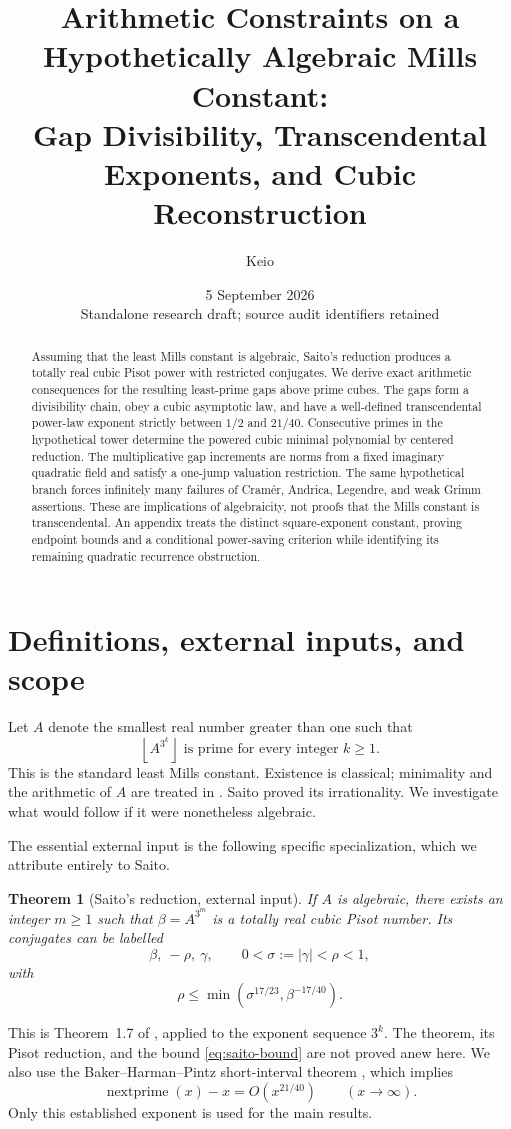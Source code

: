 \documentclass[11pt,a4paper]{article}
\author{Keio}
\date{5 September 2026\\\small Standalone research draft; source audit identifiers retained}
\title{Arithmetic Constraints on a Hypothetically Algebraic Mills Constant:\\Gap Divisibility, Transcendental Exponents, and Cubic Reconstruction}
\newtheorem{theorem}{Theorem}[section]
\theoremstyle{definition}\newtheorem{definition}[theorem]{Definition}
\theoremstyle{remark}\newtheorem{remark}[theorem]{Remark}
\newcommand{\floor}[1]{\left\lfloor #1\right\rfloor}\newcommand{\ceil}[1]{\left\lceil #1\right\rceil}
\begin{document}
\maketitle
\begin{abstract}
Assuming that the least Mills constant is algebraic, Saito's reduction produces a totally real cubic Pisot power with restricted conjugates. We derive exact arithmetic consequences for the resulting least-prime gaps above prime cubes. The gaps form a divisibility chain, obey a cubic asymptotic law, and have a well-defined transcendental power-law exponent strictly between $1/2$ and $21/40$. Consecutive primes in the hypothetical tower determine the powered cubic minimal polynomial by centered reduction. The multiplicative gap increments are norms from a fixed imaginary quadratic field and satisfy a one-jump valuation restriction. The same hypothetical branch forces infinitely many failures of Cram\'er, Andrica, Legendre, and weak Grimm assertions. These are implications of algebraicity, not proofs that the Mills constant is transcendental. An appendix treats the distinct square-exponent constant, proving endpoint bounds and a conditional power-saving criterion while identifying its remaining quadratic recurrence obstruction.
\end{abstract}
\tableofcontents

\section{Definitions, external inputs, and scope}
Let $A$ denote the smallest real number greater than one such that
\[
 \floor{A^{3^k}}\text{ is prime for every integer }k\ge1.
\]
This is the standard least Mills constant. Existence is classical; minimality and the arithmetic of $A$ are treated in \cite{saito-irrational,saito-variants}. Saito proved its irrationality. We investigate what would follow if it were nonetheless algebraic.

The essential external input is the following specific specialization, which we attribute entirely to Saito.
\begin{theorem}[Saito's reduction, external input]\label{thm:saito}
If $A$ is algebraic, there exists an integer $m\ge1$ such that $\beta=A^{3^m}$ is a totally real cubic Pisot number. Its conjugates can be labelled
\[
 \beta,\ -\rho,\ \gamma,\qquad 0<\sigma:=|\gamma|<\rho<1,
\]
with
\begin{equation}\label{eq:saito-bound}
 \rho\le\min(\sigma^{17/23},\beta^{-17/40}).
\end{equation}
\end{theorem}
This is Theorem~1.7 of \cite{saito-variants}, applied to the exponent sequence $3^k$. The theorem, its Pisot reduction, and the bound \eqref{eq:saito-bound} are not proved anew here. We also use the Baker--Harman--Pintz short-interval theorem \cite{bhp}, which implies
\begin{equation}\label{eq:bhp}
 \operatorname{nextprime}(x)-x=O(x^{21/40})\qquad(x\to\infty).
\end{equation}
Only this established exponent is used for the main results.
\end{document}
